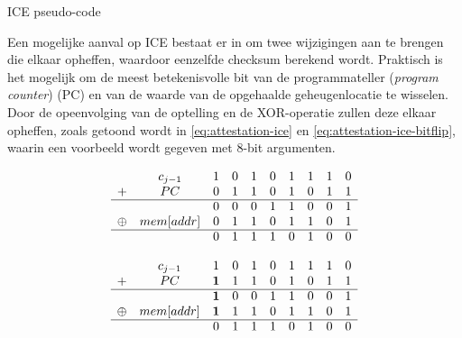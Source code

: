 \begin{algorithm}
\begin{algorithmic}[1]
     
     
       
      
        
  \EndFor
\end{algorithmic}
\caption{ICE pseudo-code\label{alg:attestation-ice}}
\end{algorithm}

Een mogelijke aanval op ICE bestaat er in om twee wijzigingen aan te brengen
die elkaar opheffen, waardoor eenzelfde checksum berekend wordt. Praktisch is
het mogelijk om de meest betekenisvolle bit van de programmateller
(\emph{program counter}) (PC) en van de waarde van de opgehaalde
geheugenlocatie te wisselen. Door de opeenvolging van de optelling en de
XOR-operatie zullen deze elkaar opheffen, zoals getoond wordt in
\ref{eq:attestation-ice} en \ref{eq:attestation-ice-bitflip}, waarin een
voorbeeld wordt gegeven met 8-bit argumenten.

\begin{equation} \label{eq:attestation-ice}
\begin{array}{cccccccccc}
       & c_{j-1}    & 1 &	0 &	1 &	0 &	1 &	1 &	1 &	0 \\
+	     & PC	        & 0	& 1	& 1	& 0	& 1	& 0	& 1	& 1 \\
\cline{1-10}
       &            &	0	& 0	& 0	& 1	& 1	& 0	& 0	& 1 \\
\oplus &	mem[addr]	& 0	& 1	& 1 &	0	& 1	& 1	& 0	& 1 \\
\cline{1-10}
       &            &	0	& 1	& 1	& 1	& 0	& 1	& 0	& 0 \\
\end{array}
\end{equation}

\begin{equation} \label{eq:attestation-ice-bitflip}
\begin{array}{cccccccccc}
       & c_{j-1}    & 1 &	0 &	1 &	0 &	1 &	1 &	1 &	0 \\
+	     & PC	        & \bm{1}	& 1	& 1	& 0	& 1	& 0	& 1	& 1 \\
\cline{1-10}
       &            &	\bm{1}	& 0	& 0	& 1	& 1	& 0	& 0	& 1 \\
\oplus &	mem[addr]	& \bm{1}	& 1	& 1 &	0	& 1	& 1	& 0	& 1 \\
\cline{1-10}
       &            &	0	& 1	& 1	& 1	& 0	& 1	& 0	& 0 \\
\end{array}
\end{equation}

